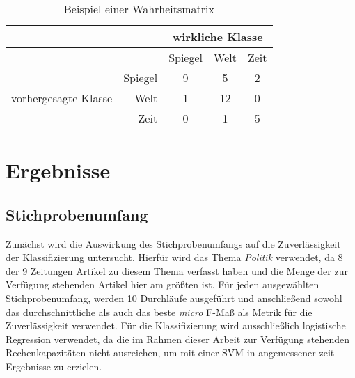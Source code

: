 \begin{table}
\centering
\begin{spacing}{1.25}
\begin{tabular}[t]{lrccc}
\toprule
~ & ~ & \multicolumn{3}{c}{wirkliche Klasse}\\
\midrule
~ & ~ & Spiegel & Welt & Zeit\\
\multirow{3}{*}{vorhergesagte Klasse} & Spiegel & 9 & 5 & 2\\
& Welt & 1 & 12 & 0\\
& Zeit & 0 & 1 & 5\\
\bottomrule
\end{tabular}
\caption{Beispiel einer Wahrheitsmatrix}
\label{table.confusion_matrix}
\end{spacing}
\end{table}

\section{Ergebnisse}

\subsection{Stichprobenumfang}
Zunächst wird die Auswirkung des Stichprobenumfangs auf die Zuverlässigkeit der Klassifizierung untersucht. Hierfür wird das Thema \emph{Politik} verwendet, da 8 der 9 Zeitungen Artikel zu diesem Thema verfasst haben und die Menge der zur Verfügung stehenden Artikel hier am größten ist. Für jeden ausgewählten Stichprobenumfang, werden 10 Durchläufe ausgeführt und anschließend sowohl das durchschnittliche als auch das beste \textit{micro} F-Maß als Metrik für die Zuverlässigkeit verwendet. Für die Klassifizierung wird ausschließlich logistische Regression verwendet, da die im Rahmen dieser Arbeit zur Verfügung stehenden Rechenkapazitäten nicht ausreichen, um mit einer SVM in angemessener zeit Ergebnisse zu erzielen.


